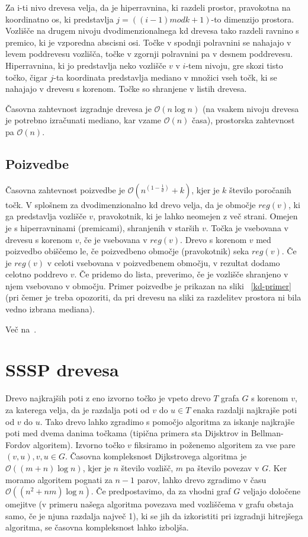 \documentclass[a4paper, 12pt]{book}
\newcommand{\OO}{\ensuremath{\mathcal{O}}} %
\begin{document}
Za i-ti nivo drevesa velja, da je hiperravnina, ki razdeli prostor, pravokotna na koordinatno os, ki predstavlja $j = ((i-1) mod k + 1)$-to dimenzijo prostora. Vozlišče na drugem nivoju dvodimenzionalnega kd drevesa tako razdeli
ravnino s premico, ki je vzporedna abscisni osi. Točke v spodnji polravnini se nahajajo v levem poddrevesu vozlišča, točke v zgornji polravnini pa v desnem poddrevesu. Hiperravnina, ki jo predstavlja neko vozlišče $v$ v $i$-tem nivoju,
gre skozi tisto točko, čigar $j$-ta koordinata predstavlja mediano v množici vseh točk, ki se nahajajo v drevesu s korenom. Točke so shranjene v listih drevesa.

Časovna zahtevnost izgradnje drevesa je $\OO(n\log n)$ (na vsakem nivoju drevesa je potrebno izračunati mediano, kar vzame $\OO(n)$ časa), prostorska zahtevnost pa $\OO(n)$.
\subsection{Poizvedbe}
Časovna zahtevnost poizvedbe je $\OO(n^{(1-\frac{1}{d})} + k)$, kjer je $k$ število poročanih točk. V splošnem za dvodimenzionalno kd drevo velja, da je območje $reg(v)$, ki ga predstavlja vozlišče $v$, pravokotnik, ki je lahko neomejen z več strani. Omejen je s hiperravninami (premicami), shranjenih v starših $v$. Točka je vsebovana v drevesu s korenom $v$, če je vsebovana v $reg(v)$. Drevo s korenom $v$ med poizvedbo obiščemo le, če poizvedbeno območje (pravokotnik) seka $reg(v)$. Če
je $reg(v)$ v celoti vsebovana v poizvedbenem območju, v rezultat dodamo celotno poddrevo $v$. Če pridemo do lista, preverimo, če je vozlišče shranjeno v njem vsebovano v območju. Primer poizvedbe je prikazan na sliki ~\ref{kd-primer} (pri čemer je treba opozoriti, da pri drevesu na sliki za razdelitev prostora ni bila vedno izbrana mediana).


Več na~\cite{bkos-08}.

\section{SSSP drevesa}
Drevo najkrajših poti z eno izvorno točko je vpeto drevo $T$ grafa $G$ s korenom $v$, za katerega velja, da je razdalja poti od $v$ do $u \in T$ enaka razdalji najkrajše poti od $v$ do $u$. Tako drevo lahko zgradimo s pomočjo algoritma za iskanje najkrajše poti med dvema danima točkama (tipična primera sta Dijsktrov in Bellman-Fordov algoritem). Izvorno točko $v$ fiksiramo in poženemo algoritem za vse pare $(v, u), v,u \in G.$ Časovna kompleksnost Dijkstrovega algoritma je $\OO((m+n)\log n)$, kjer je $n$ število vozlišč, $m$ pa število povezav v $G$. Ker moramo algoritem pognati za $n-1$ parov, lahko drevo zgradimo v času $\OO((n^2 + nm)\log n)$. Če predpostavimo, da za vhodni graf $G$ veljajo določene omejitve (v primeru našega algoritma povezava med vozliščema v grafu obstaja samo, če je njuna razdalja največ 1), ki se jih da izkoristiti pri izgradnji hitrejšega algoritma, se časovna kompleksnost lahko izboljša.
\end{document}
